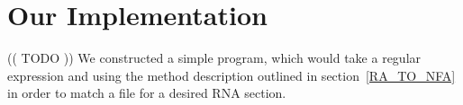 \section{Our Implementation}
(( TODO ))
We constructed  a simple program, which would take a regular expression and using the method description outlined in section~\ref{RA_TO_NFA} in order to match a file for a desired RNA section.